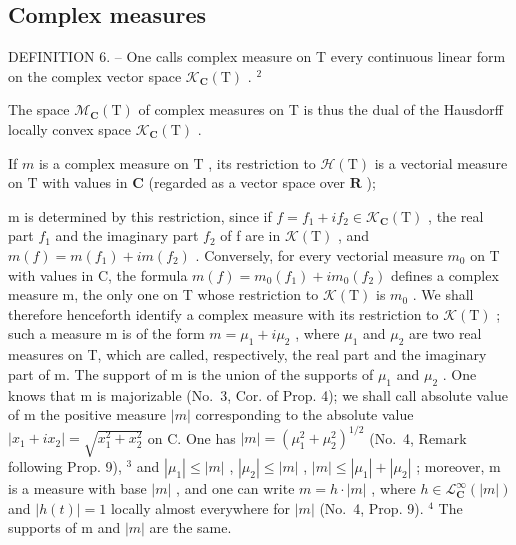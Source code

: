 \subsection{Complex measures}

DEFINITION 6. -- One calls complex measure on T every continuous linear form on the complex vector space \(\mathcal{K}_{\mathbf{C}}(\mathrm{T})\) . \(^{2}\)

The space \(\mathcal{M}_{\mathbf{C}}(\mathrm{T})\) of complex measures on T is thus the dual of the Hausdorff locally convex space \(\mathcal{K}_{\mathbf{C}}(\mathrm{T})\) .

If \(m\) is a complex measure on \(\mathrm{T}\) , its restriction to \(\mathcal{H}(\mathrm{T})\) is a vectorial measure on \(\mathrm{T}\) with values in \(\mathbf{C}\) (regarded as a vector space over \(\mathbf{R}\) );

m is determined by this restriction, since if \(f = f_{1} + if_{2} \in \mathcal{K}_{\mathbf{C}}(\mathrm{T})\) , the real part \(f_{1}\) and the imaginary part \(f_{2}\) of f are in \(\mathcal{K}(\mathrm{T})\) , and \(m(f) = m(f_{1}) + im(f_{2})\) . Conversely, for every vectorial measure \(m_{0}\) on T with values in C, the formula \(m(f) = m_{0}(f_{1}) + im_{0}(f_{2})\) defines a complex measure m, the only one on T whose restriction to \(\mathcal{K}(\mathrm{T})\) is \(m_{0}\) . We shall therefore henceforth identify a complex measure with its restriction to \(\mathcal{K}(\mathrm{T})\) ; such a measure m is of the form \(m = \mu_{1} + i\mu_{2}\) , where \(\mu_{1}\) and \(\mu_{2}\) are two real measures on T, which are called, respectively, the real part and the imaginary part of m. The support of m is the union of the supports of \(\mu_{1}\) and \(\mu_{2}\) . One knows that m is majorizable (No.~3, Cor. of Prop. 4); we shall call absolute value of m the positive measure \(|m|\) corresponding to the absolute value \(|x_{1} + ix_{2}| = \sqrt{x_{1}^{2} + x_{2}^{2}}\) on C. One has \(|m| = (\mu_{1}^{2} + \mu_{2}^{2})^{1/2}\) (No.~4, Remark following Prop. 9), \(^{3}\) and \(|\mu_{1}| \leqslant |m|\) , \(|\mu_{2}| \leqslant |m|\) , \(|m| \leqslant |\mu_{1}| + |\mu_{2}|\) ; moreover, m is a measure with base \(|m|\) , and one can write \(m = h \cdot |m|\) , where \(h \in \mathcal{L}_{\mathbf{C}}^{\infty}(|m|)\) and \(|h(t)| = 1\) locally almost everywhere for \(|m|\) (No.~4, Prop. 9). \(^{4}\) The supports of m and \(|m|\) are the same.

